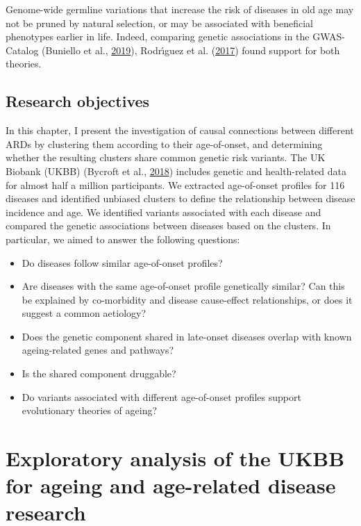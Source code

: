 \documentclass[12pt,twoside]{unicam}
\providecommand{\tightlist}{%
  \setlength{\itemsep}{0pt}\setlength{\parskip}{0pt}}
\begin{document}
Genome-wide germline variations that increase the risk of diseases in old age may not be pruned by natural selection, or may be associated with beneficial phenotypes earlier in life. Indeed, comparing genetic associations in the GWAS-Catalog (Buniello et al., \protect\hyperlink{ref-Buniello2019}{2019}), Rodrı́guez et al. (\protect\hyperlink{ref-Rodriguez2017}{2017}) found support for both theories.

\hypertarget{research-objectives-1}{%
\subsection{Research objectives}\label{research-objectives-1}}

In this chapter, I present the investigation of causal connections between different ARDs by clustering them according to their age-of-onset, and determining whether the resulting clusters share common genetic risk variants. The UK Biobank (UKBB) (Bycroft et al., \protect\hyperlink{ref-Bycroft2018}{2018}) includes genetic and health-related data for almost half a million participants. We extracted age-of-onset profiles for 116 diseases and identified unbiased clusters to define the relationship between disease incidence and age. We identified variants associated with each disease and compared the genetic associations between diseases based on the clusters. In particular, we aimed to answer the following questions:

\begin{itemize}
\tightlist
\item
  Do diseases follow similar age-of-onset profiles?
\item
  Are diseases with the same age-of-onset profile genetically similar? Can this be explained by co-morbidity and disease cause-effect relationships, or does it suggest a common aetiology?
\item
  Does the genetic component shared in late-onset diseases overlap with known ageing-related genes and pathways?
\item
  Is the shared component druggable?
\item
  Do variants associated with different age-of-onset profiles support evolutionary theories of ageing?
\end{itemize}

\hypertarget{exploratory-analysis-of-the-ukbb-for-ageing-and-age-related-disease-research}{%
\section{Exploratory analysis of the UKBB for ageing and age-related disease research}\label{exploratory-analysis-of-the-ukbb-for-ageing-and-age-related-disease-research}}
\end{document}
